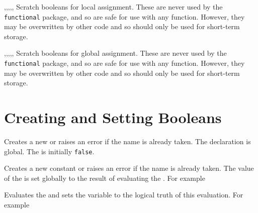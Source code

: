 \documentclass[oneside]{book}
\begin{document}
\begin{variable}{\lTmpaBool,\lTmpbBool,\lTmpcBool,\lTmpiBool,\lTmpjBool,\lTmpkBool}
Scratch booleans for local assignment. These are never used by
the \verb!functional! package, and so are safe for use with any
function. However, they may be overwritten by other
code and so should only be used for short-term storage.
\end{variable}

\begin{variable}{\gTmpaBool,\gTmpbBool,\gTmpcBool,\gTmpiBool,\gTmpjBool,\gTmpkBool}
Scratch booleans for global assignment. These are never used by
the \verb!functional! package, and so are safe for use with any
function. However, they may be overwritten by other
code and so should only be used for short-term storage.
\end{variable}

\section{Creating and Setting Booleans}

\begin{function}{\BoolNew}
\begin{syntax}
 
\end{syntax}
Creates a new  or raises an error if the
name is already taken. The declaration is global. The
 is initially \texttt{false}.
\end{function}

\begin{function}{\BoolConst}
\begin{syntax}
  
\end{syntax}
Creates a new constant  or raises an error if the name
is already taken. The value of the  is set globally to
the result of evaluating the .
For example
\begin{codehigh}
\BoolConst {}
\BoolVarLog \cFooSomeBool
\end{codehigh}
\end{function}

\begin{function}{\BoolSet}
\begin{syntax}
  
\end{syntax}
Evaluates the  and sets the  variable to
the logical truth of this evaluation.
For example
\begin{codehigh}
\BoolSet {}
\BoolVarLog \lTmpaBool
\end{codehigh}
\end{function}
\end{document}
